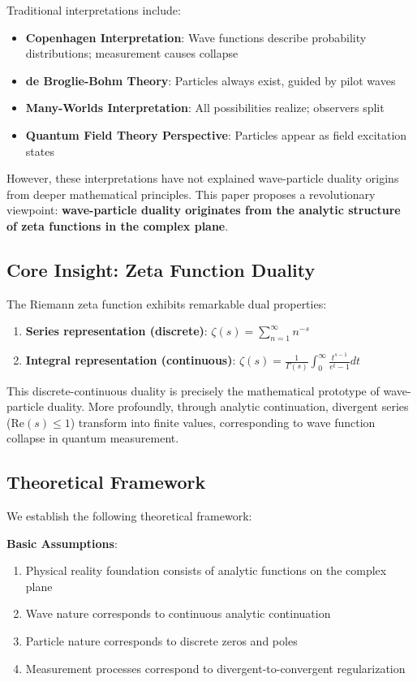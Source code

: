 \documentclass[11pt]{article}
\theoremstyle{plain}
\theoremstyle{definition}
\theoremstyle{remark}
\begin{document}
Traditional interpretations include:
\begin{itemize}
\item \textbf{Copenhagen Interpretation}: Wave functions describe probability distributions; measurement causes collapse
\item \textbf{de Broglie-Bohm Theory}: Particles always exist, guided by pilot waves
\item \textbf{Many-Worlds Interpretation}: All possibilities realize; observers split
\item \textbf{Quantum Field Theory Perspective}: Particles appear as field excitation states
\end{itemize}

However, these interpretations have not explained wave-particle duality origins from deeper mathematical principles. This paper proposes a revolutionary viewpoint: \textbf{wave-particle duality originates from the analytic structure of zeta functions in the complex plane}.

\subsection{Core Insight: Zeta Function Duality}

The Riemann zeta function exhibits remarkable dual properties:
\begin{enumerate}
\item \textbf{Series representation (discrete)}: $\zeta(s) = \sum_{n=1}^{\infty} n^{-s}$
\item \textbf{Integral representation (continuous)}: $\zeta(s) = \frac{1}{\Gamma(s)} \int_0^{\infty} \frac{t^{s-1}}{e^t - 1} dt$
\end{enumerate}

This discrete-continuous duality is precisely the mathematical prototype of wave-particle duality. More profoundly, through analytic continuation, divergent series ($\text{Re}(s) \leq 1$) transform into finite values, corresponding to wave function collapse in quantum measurement.

\subsection{Theoretical Framework}

We establish the following theoretical framework:

\textbf{Basic Assumptions}:
\begin{enumerate}
\item Physical reality foundation consists of analytic functions on the complex plane
\item Wave nature corresponds to continuous analytic continuation
\item Particle nature corresponds to discrete zeros and poles
\item Measurement processes correspond to divergent-to-convergent regularization
\end{enumerate}
\end{document}
